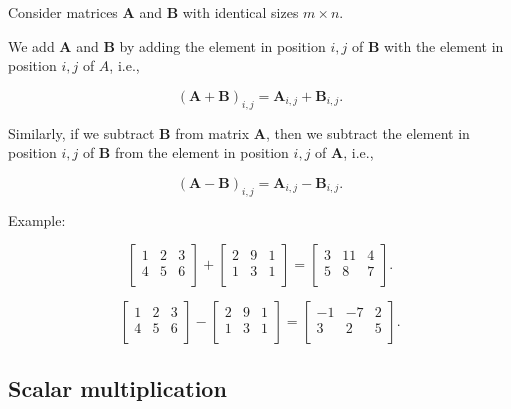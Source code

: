 \documentclass[
]{book}
\theoremstyle{definition}
\theoremstyle{definition}
\theoremstyle{definition}
\theoremstyle{definition}
\theoremstyle{remark}
\begin{document}
Consider matrices \(\mathbf{A}\) and \(\mathbf{B}\) with identical sizes \(m\times n\).

We add \(\mathbf{A}\) and \(\mathbf{B}\) by adding the element in position \(i,j\) of \(\mathbf{B}\) with the element in position \(i,j\) of \(A\), i.e.,

\[(\mathbf{A} + \mathbf{B})_{i,j} = \mathbf{A}_{i,j} + \mathbf{B}_{i,j}.\]

Similarly, if we subtract \(\mathbf{B}\) from matrix \(\mathbf{A}\), then we subtract the element in position \(i,j\) of \(\mathbf{B}\) from the element in position \(i,j\) of \(\mathbf{A}\), i.e.,

\[(\mathbf{A} - \mathbf{B})_{i,j} = \mathbf{A}_{i,j} - \mathbf{B}_{i,j}.\]

Example:

\[
\begin{bmatrix}
1 & 2 & 3 \\
4 & 5 & 6 \\
\end{bmatrix} + 
\begin{bmatrix}
2 & 9 & 1 \\
1 & 3 & 1 \\
\end{bmatrix} = 
\begin{bmatrix}
3 & 11 & 4 \\
5 & 8 & 7 \\
\end{bmatrix}.
\]

\[
\begin{bmatrix}
1 & 2 & 3 \\
4 & 5 & 6 \\
\end{bmatrix} - 
\begin{bmatrix}
2 & 9 & 1 \\
1 & 3 & 1 \\
\end{bmatrix} = 
\begin{bmatrix}
-1 & -7 & 2 \\
3 & 2 & 5 \\
\end{bmatrix}.
\]

\hypertarget{scalar-multiplication}{%
\subsection{Scalar multiplication}\label{scalar-multiplication}}
\end{document}
